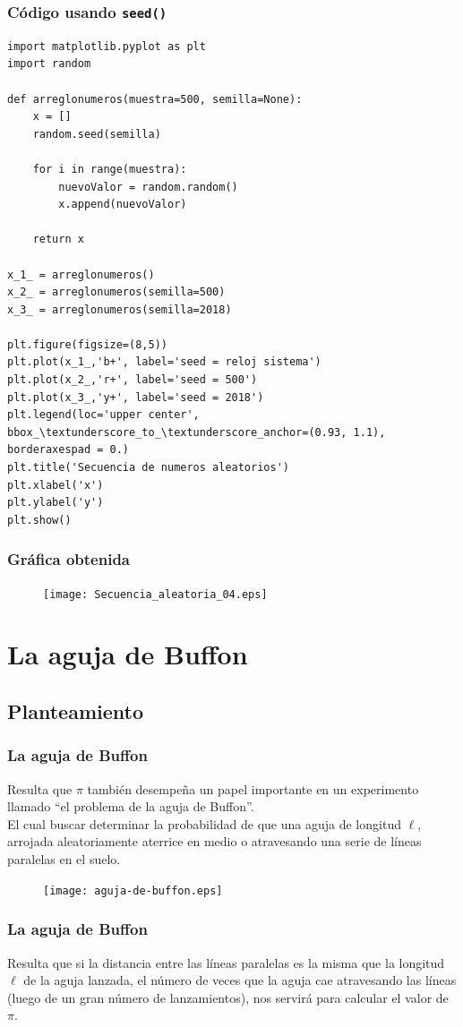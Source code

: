 \begin{frame}
\frametitle{Código usando \texttt{seed()}}
\begin{lstlisting}[caption=Código con semilla, style=FormattedNumber, basicstyle=\linespread{1.1}\ttfamily=\small, columns=fullflexible]
import matplotlib.pyplot as plt
import random

def arreglonumeros(muestra=500, semilla=None):
    x = []
    random.seed(semilla)
    
    for i in range(muestra):
        nuevoValor = random.random()
        x.append(nuevoValor)
    
    return x

x_1_ = arreglonumeros()
x_2_ = arreglonumeros(semilla=500)
x_3_ = arreglonumeros(semilla=2018)

plt.figure(figsize=(8,5)) 
plt.plot(x_1_,'b+', label='seed = reloj sistema')
plt.plot(x_2_,'r+', label='seed = 500')
plt.plot(x_3_,'y+', label='seed = 2018')
plt.legend(loc='upper center', bbox_\textunderscore_to_\textunderscore_anchor=(0.93, 1.1), borderaxespad = 0.)
plt.title('Secuencia de numeros aleatorios')
plt.xlabel('x')
plt.ylabel('y')
plt.show()
\end{lstlisting}
\end{frame}
\begin{frame}[fragile]
\frametitle{Gráfica obtenida}
\begin{figure}
  \centering
  \texttt{[image: Secuencia\_aleatoria\_04.eps]}
\end{figure}
\end{frame}
\section{La aguja de Buffon}
\subsection{Planteamiento}
\begin{frame}
\frametitle{La aguja de Buffon}
Resulta que $\pi$ también desempeña un papel importante en un experimento llamado \enquote{el problema de la aguja de Buffon}.
\\
\bigskip
El cual buscar determinar la probabilidad de que una aguja de longitud $\ell$, arrojada aleatoriamente aterrice en medio o atravesando una serie de líneas paralelas en el suelo.
\end{frame}
\begin{frame}
\begin{figure}
	\centering
	\texttt{[image: aguja-de-buffon.eps]}
\end{figure}
\end{frame}
\begin{frame}
\frametitle{La aguja de Buffon}
Resulta que si la distancia entre las líneas paralelas es la misma que la longitud $\ell$ de la aguja lanzada, el número de veces que la aguja cae atravesando las líneas (luego de un gran número de lanzamientos), nos servirá para calcular el valor de $\pi$.
\end{frame}
